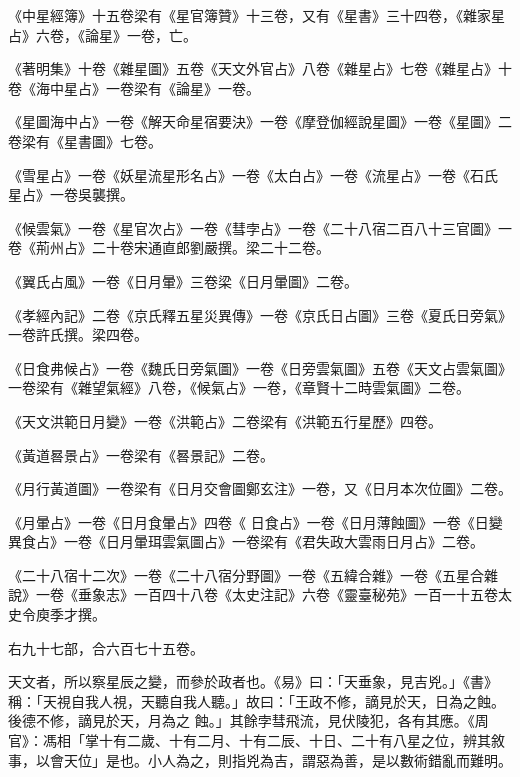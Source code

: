 \begin{pinyinscope}
 《中星經簿》十五卷梁有《星官簿贊》十三卷，又有《星書》三十四卷，《雜家星占》六卷，《論星》一卷，亡。



 《著明集》十卷《雜星圖》五卷《天文外官占》八卷《雜星占》七卷《雜星占》十卷《海中星占》一卷梁有《論星》一卷。



 《星圖海中占》一卷《解天命星宿要決》一卷《摩登伽經說星圖》一卷《星圖》二卷梁有《星書圖》七卷。



 《雪星占》一卷《妖星流星形名占》一卷《太白占》一卷《流星占》一卷《石氏
 星占》一卷吳襲撰。



 《候雲氣》一卷《星官次占》一卷《彗孛占》一卷《二十八宿二百八十三官圖》一卷《荊州占》二十卷宋通直郎劉嚴撰。梁二十二卷。



 《翼氏占風》一卷《日月暈》三卷梁《日月暈圖》二卷。



 《孝經內記》二卷《京氏釋五星災異傳》一卷《京氏日占圖》三卷《夏氏日旁氣》一卷許氏撰。梁四卷。



 《日食弗候占》一卷《魏氏日旁氣圖》一卷《日旁雲氣圖》五卷《天文占雲氣圖》一卷梁有《雜望氣經》八卷，《候氣占》一卷，《章賢十二時雲氣圖》二卷。



 《天文洪範日月變》一卷《洪範占》二卷梁有《洪範五行星歷》四卷。



 《黃道晷景占》一卷梁有《晷景記》二卷。



 《月行黃道圖》一卷梁有《日月交會圖鄭玄注》一卷，又《日月本次位圖》二卷。



 《月暈占》一卷《日月食暈占》四卷《
 日食占》一卷《日月薄蝕圖》一卷《日變異食占》一卷《日月暈珥雲氣圖占》一卷梁有《君失政大雲雨日月占》二卷。



 《二十八宿十二次》一卷《二十八宿分野圖》一卷《五緯合雜》一卷《五星合雜說》一卷《垂象志》一百四十八卷《太史注記》六卷《靈臺秘苑》一百一十五卷太史令庾季才撰。



 右九十七部，合六百七十五卷。



 天文者，所以察星辰之變，而參於政者也。《易》曰：「天垂象，見吉兇。」《書》稱：「天視自我人視，天聽自我人聽。」故曰：「王政不修，謫見於天，日為之蝕。後德不修，謫見於天，月為之
 蝕。」其餘孛彗飛流，見伏陵犯，各有其應。《周官》：馮相「掌十有二歲、十有二月、十有二辰、十日、二十有八星之位，辨其敘事，以會天位」是也。小人為之，則指兇為吉，謂惡為善，是以數術錯亂而難明。




\end{pinyinscope}
